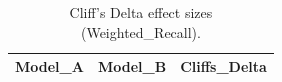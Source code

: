 \begin{table}[t]
\centering
\begin{tabular}{lll}
\toprule
Model_A & Model_B & Cliffs_Delta \\
\midrule
\bottomrule
\end{tabular}
\caption{Cliff's Delta effect sizes (Weighted_Recall).}
\label{tab:cliffs_Weighted_Recall}
\end{table}